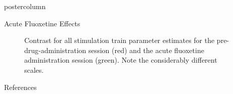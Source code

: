 \documentclass{beamer}
\begin{document}
\begin{frame}
\begin{columns}
\begin{column}{.57\textwidth}
\begin{beamercolorbox}[center]{postercolumn}
\begin{minipage}{.98\textwidth}
{\begin{myblock}{Acute Fluoxetine Effects}
\begin{figure}
\begin{minipage}{0.85\textwidth}
								\caption{Contrast for all stimulation train parameter estimates for the pre-drug-administration session (red) and the acute fluoxetine administration session (green). Note the considerably different scales.}
								\label{fig:fail}
							\end{minipage}
						\end{figure}
					\end{myblock}\vfill
					\begin{myblock}{References}
						\footnotesize
						
						
					\end{myblock}\vfill
		}\end{minipage}\end{beamercolorbox}
	\end{column}
\end{columns}
\end{frame}
\end{document}
